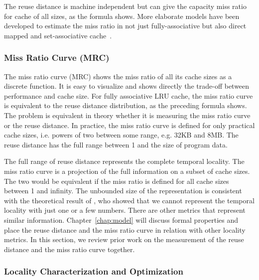 The reuse distance is machine independent but can give the capacity
miss ratio for cache of all sizes, as the formula shows.  More
elaborate models have been developed to estimate the miss ratio in not
just fully-associative but also direct mapped and set-associative
cache~\citep{Smith:ICSE76,HillS:TOC89,MarinM:SIGMETRICS04}.


\subsubsection{Miss Ratio Curve (MRC)}

The miss ratio curve (MRC) shows the miss ratio of all its cache sizes
as a discrete function.  It is easy to visualize and shows directly
the trade-off between performance and cache size.  For fully
associative LRU cache, the miss ratio curve is equivalent to the reuse
distance distribution, as the preceding formula shows.  The problem is
equivalent in theory whether it is measuring the miss ratio curve or
the reuse distance.  In practice, the miss ratio curve is defined for
only practical cache sizes, i.e. powers of two between some range,
e.g. 32KB and 8MB.  The reuse distance has the full range between 1
and the size of program data.

The full range of reuse distance represents the complete temporal
locality.  The miss ratio curve is a projection of the full
information on a subset of cache sizes.  The two would be equivalent if the
miss ratio is defined for all cache sizes between 1 and infinity.  The
unbounded size of the representation is consistent with the
theoretical result of \citet{SnirY:locality05}, who showed that
we cannot represent the temporal locality with just one or a few
numbers.  There are other metrics that represent similar information.
Chapter~\ref{chap:model} will discuss formal properties and place the
reuse distance and the miss ratio curve in relation with other
locality metrics.  In this section, we review prior work on the
measurement of the reuse distance and the miss ratio curve
together.

\subsubsection{Locality Characterization and Optimization}


